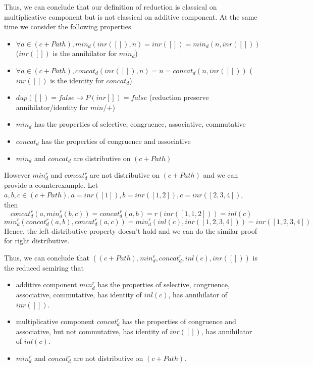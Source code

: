 \documentclass[a4paper,10pt]{article}
\begin{document}
Thus, we can conclude that our definition of reduction is classical on multiplicative component but is not classical on additive component. At the same time we consider the following properties.
\begin{itemize}
  \item $\forall a \in (c + Path), min_d(inr([]),n) = inr([]) = min_d(n,inr([]))$ ($inr([])$ is the annihilator for $min_d$)
  \item $\forall a \in (c + Path), concat_d(inr([]),n) = n = concat_d(n,inr([]))$ ($inr([])$ is the identity for $concat_d$)
  \item $ dup([]) = false \rightarrow P(inr[]) = false$ (reduction preserve annihilator/identity for $min$/$+$)
  \item $min_d$ has the properties of selective, congruence, associative, commutative
  \item $concat_d$ has the properties of congruence and associative
  \item $min_d$ and $concat_d$ are distributive on $(c + Path)$
\end{itemize}

However $min^r_d$ and $concat^r_d$ are not distributive on $(c + Path)$ and we can provide a counterexample. Let $a,b,c \in (c + Path), a = inr([1]), b = inr([1,2]), c = inr([2,3,4])$, then 
\[concat^r_d (a,min^r_d(b,c)) = concat^r_d (a,b) = r(inr([1,1,2])) = inl(c)\]
\[min^r_d (concat^r_d(a,b),concat^r_d(a,c)) = min^r_d (inl(c),inr([1,2,3,4])) = inr([1,2,3,4])\]
Hence, the left distributive property doesn't hold and we can do the similar proof for right distributive.

Thus, we can conclude that $((c + Path),min^r_d,concat^r_d,inl(c),inr([]))$ is the reduced semiring that 
\begin{itemize}
  \item additive component $min^r_d$ has the properties of selective, congruence, associative, commutative, has identity of $inl(c)$, has annihilator of $inr([])$.
  \item multiplicative component $concat^r_d$ has the properties of congruence and associative, but not commutative, has identity of $inr([])$, has annihilator of $inl(c)$.
  \item $min^r_d$ and $concat^r_d$ are not distributive on $(c + Path)$.
\end{itemize}
\end{document}
